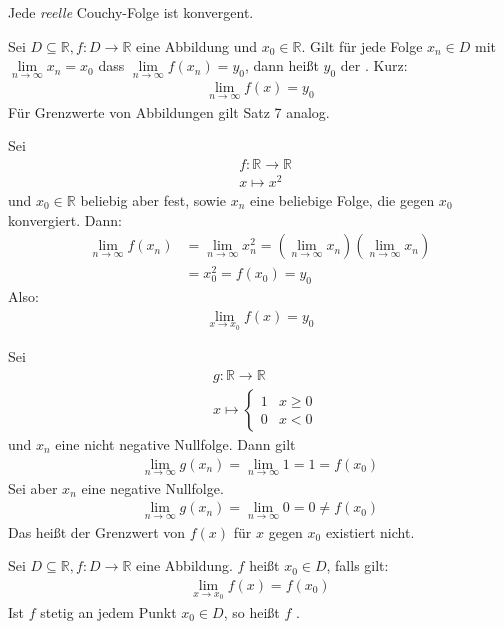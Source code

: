 
Jede \textit{reelle} Couchy-Folge ist konvergent.

Sei $D \subseteq \mathbb{R}, f : D \rightarrow \mathbb{R}$ eine Abbildung und $x_0 \in \mathbb{R}$. Gilt für jede Folge $x_n \in D$ mit $\lim\limits_{n \to \infty}x_n = x_0$ dass $\lim\limits_{n \to \infty}f(x_n) = y_0$, dann heißt $y_0$ der . Kurz:
\begin{align*}
	\lim\limits_{n \to \infty}f(x) = y_0
\end{align*}
Für Grenzwerte von Abbildungen gilt Satz 7 analog.

Sei
\begin{align*}
	&f : \mathbb{R} \rightarrow \mathbb{R} \\
	&x \mapsto x^2
\end{align*}
und $x_0 \in \mathbb{R}$ beliebig aber fest, sowie $x_n$ eine beliebige Folge, die gegen $x_0$ konvergiert. Dann:
\begin{align*}
	\lim\limits_{n \to \infty}f(x_n) &= \lim\limits_{n \to \infty}x_n^2 = \left(\lim\limits_{n \to \infty}x_n\right)\left(\lim\limits_{n \to \infty}x_n\right) \\
	&= x_0^2 = f(x_0) = y_0
\end{align*}
Also:
\begin{align*}
	\lim\limits_{x \to x_0}f(x) = y_0
\end{align*}

Sei
\begin{align*}
	&g : \mathbb{R} \rightarrow \mathbb{R} \\
	&x \mapsto \begin{cases}
		1 & x \geq 0 \\
		0 & x < 0
	\end{cases}
\end{align*}
und $x_n$ eine nicht negative Nullfolge. Dann gilt
\begin{align*}
	\lim\limits_{n \to \infty}g(x_n) = \lim\limits_{n \to \infty}1 = 1 = f(x_0)
\end{align*}
Sei aber $x_n$ eine negative Nullfolge.
\begin{align*}
	\lim\limits_{n \to \infty}g(x_n) = \lim\limits_{n \to \infty}0 = 0 \neq f(x_0)
\end{align*}
Das heißt der Grenzwert von $f(x)$ für $x$ gegen $x_0$ existiert nicht.

Sei $D \subseteq \mathbb{R}, f : D \rightarrow \mathbb{R}$ eine Abbildung. $f$ heißt  $x_0 \in D$, falls gilt:
\begin{align*}
	\lim\limits_{x \to x_0}f(x) = f(x_0)
\end{align*}
Ist $f$ stetig an jedem Punkt $x_0 \in D$, so heißt $f$ .

